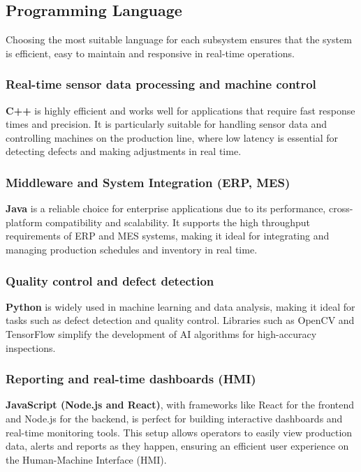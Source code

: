 \subsection{Programming Language} %
Choosing the most suitable language for each subsystem ensures that the system is efficient, easy to maintain and responsive in real-time operations.

\subsubsection{Real-time sensor data processing and machine control}
\textbf{C++} is highly efficient and works well for applications that require fast response times and precision. It is particularly suitable for handling sensor data and controlling machines on the production line, where low latency is essential for detecting defects and making adjustments in real time.

\subsubsection{Middleware and System Integration (ERP, MES)}
\textbf{Java} is a reliable choice for enterprise applications due to its performance, cross-platform compatibility and scalability. It supports the high throughput requirements of ERP and MES systems, making it ideal for integrating and managing production schedules and inventory in real time.

\subsubsection{Quality control and defect detection}
\textbf{Python} is widely used in machine learning and data analysis, making it ideal for tasks such as defect detection and quality control. Libraries such as OpenCV and TensorFlow simplify the development of AI algorithms for high-accuracy inspections.

\subsubsection{Reporting and real-time dashboards (HMI)}
\textbf{JavaScript (Node.js and React)}, with frameworks like React for the frontend and Node.js for the backend, is perfect for building interactive dashboards and real-time monitoring tools. This setup allows operators to easily view production data, alerts and reports as they happen, ensuring an efficient user experience on the Human-Machine Interface (HMI).

